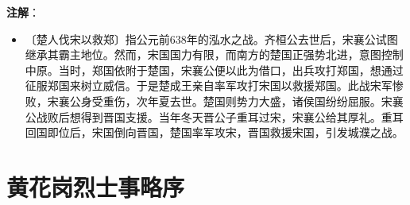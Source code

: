 \documentclass[12pt,UTF-8,openany,a4]{ctexbook}
\begin{document}
\newpage

\begin{Large}
   \noindent \textbf{注解}：
\end{Large}

\vspace{-1em}

\begin{itemize}
    \setlength\itemsep{-0.2em}
    \item〔楚人伐宋以救郑〕{\yiwen 指公元前638年的泓水之战。齐桓公去世后，宋襄公试图继承其霸主地位。然而，宋国国力有限，而南方的楚国正强势北进，意图控制中原。当时，郑国依附于楚国，宋襄公便以此为借口，出兵攻打郑国，想通过征服郑国来树立威信。于是楚成王亲自率军攻打宋国以救援郑国。此战宋军惨败，宋襄公身受重伤，次年夏去世。楚国则势力大盛，诸侯国纷纷屈服。宋襄公战败后想得到晋国支援。当年冬天晋公子重耳过宋，宋襄公给其厚礼。重耳回国即位后，宋国倒向晋国，楚国率军攻宋，晋国救援宋国，引发城濮之战。}
\end{itemize}


\chapter{黄花岗烈士事略序}
\end{document}
